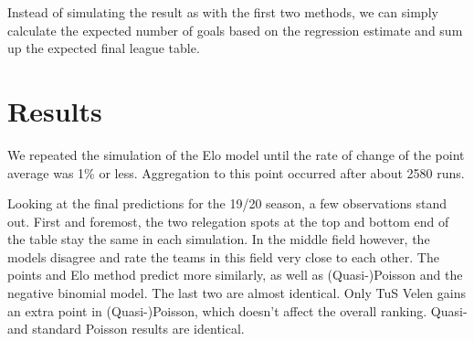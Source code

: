 \documentclass[12pt,a4paper]{article}
\begin{document}
Instead of simulating the result as with the first two methods, we can
simply calculate the expected number of goals based on the regression
estimate and sum up the expected final league table.

\hypertarget{results}{%
\section{Results}\label{results}}

We repeated the simulation of the Elo model until the rate of change of
the point average was 1\% or less. Aggregation to this point occurred
after about 2580 runs.

Looking at the final predictions for the 19/20 season, a few
observations stand out. First and foremost, the two relegation spots at
the top and bottom end of the table stay the same in each simulation. In
the middle field however, the models disagree and rate the teams in this
field very close to each other. The points and Elo method predict more
similarly, as well as (Quasi-)Poisson and the negative binomial model.
The last two are almost identical. Only TuS Velen gains an extra point
in (Quasi-)Poisson, which doesn't affect the overall ranking. Quasi- and
standard Poisson results are identical.
\end{document}
